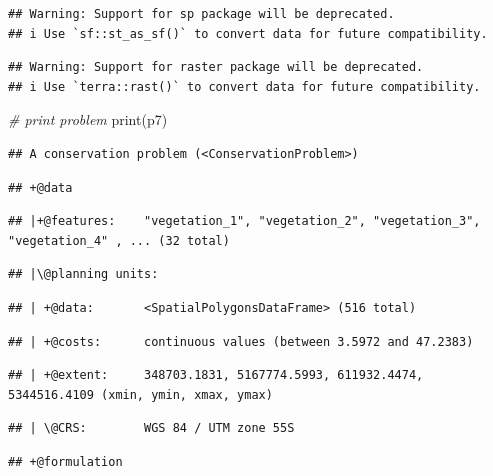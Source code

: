 \documentclass[
  12pt,
]{book}
\newenvironment{Shaded}{\begin{snugshade}}{\end{snugshade}}
\newcommand{\CommentTok}[1]{\textcolor[rgb]{0.56,0.35,0.01}{\textit{#1}}}
\newcommand{\FunctionTok}[1]{\textcolor[rgb]{0.00,0.00,0.00}{#1}}
\newcommand{\NormalTok}[1]{#1}
\begin{document}
\begin{verbatim}
## Warning: Support for sp package will be deprecated.
## i Use `sf::st_as_sf()` to convert data for future compatibility.
\end{verbatim}

\begin{verbatim}
## Warning: Support for raster package will be deprecated.
## i Use `terra::rast()` to convert data for future compatibility.
\end{verbatim}

\begin{Shaded}
\begin{Highlighting}[]
\CommentTok{\# print problem}
\FunctionTok{print}\NormalTok{(p7)}
\end{Highlighting}
\end{Shaded}

\begin{verbatim}
## A conservation problem (<ConservationProblem>)
\end{verbatim}

\begin{verbatim}
## +@data
\end{verbatim}

\begin{verbatim}
## |+@features:    "vegetation_1", "vegetation_2", "vegetation_3", "vegetation_4" , ... (32 total)
\end{verbatim}

\begin{verbatim}
## |\@planning units:
\end{verbatim}

\begin{verbatim}
## | +@data:       <SpatialPolygonsDataFrame> (516 total)
\end{verbatim}

\begin{verbatim}
## | +@costs:      continuous values (between 3.5972 and 47.2383)
\end{verbatim}

\begin{verbatim}
## | +@extent:     348703.1831, 5167774.5993, 611932.4474, 5344516.4109 (xmin, ymin, xmax, ymax)
\end{verbatim}

\begin{verbatim}
## | \@CRS:        WGS 84 / UTM zone 55S
\end{verbatim}

\begin{verbatim}
## +@formulation
\end{verbatim}
\end{document}
